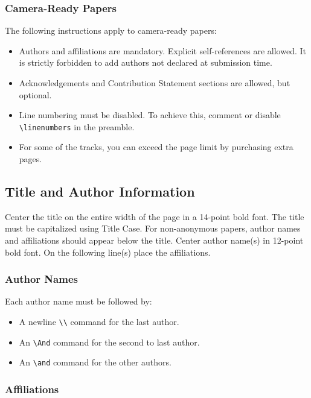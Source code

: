 \documentclass{article}
\begin{document}
\subsubsection{Camera-Ready Papers}
The following instructions apply to camera-ready papers:

\begin{itemize}
	\item Authors and affiliations are mandatory. Explicit self-references are allowed. It is strictly forbidden to add authors not declared at submission time.

	\item Acknowledgements and Contribution Statement sections are allowed, but optional.

	\item Line numbering must be disabled. To achieve this, comment or disable {\tt \textbackslash{}linenumbers} in the preamble.

	\item For some of the tracks, you can exceed the page limit by purchasing extra pages.
\end{itemize}

\subsection{Title and Author Information}

Center the title on the entire width of the page in a 14-point bold
font. The title must be capitalized using Title Case. For non-anonymous papers, author names and affiliations should appear below the title. Center author name(s) in 12-point bold font. On the following line(s) place the affiliations.

\subsubsection{Author Names}

Each author name must be followed by:
\begin{itemize}
	\item A newline {\tt \textbackslash{}\textbackslash{}} command for the last author.
	\item An {\tt \textbackslash{}And} command for the second to last author.
	\item An {\tt \textbackslash{}and} command for the other authors.
\end{itemize}

\subsubsection{Affiliations}
\end{document}
